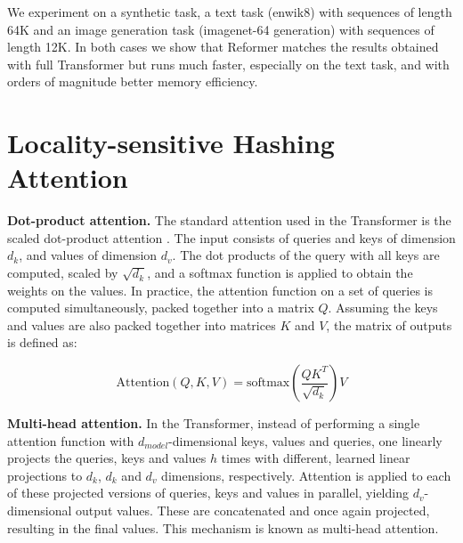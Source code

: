 \documentclass{article} %
\renewcommand{\paragraph}[1]{\textbf{#1}}
\begin{document}
We experiment on a synthetic task, a text task (enwik8) with sequences of length 64K and an image generation task (imagenet-64 generation)
with sequences of length 12K. In both cases we show that Reformer matches the results obtained with full Transformer
but runs much faster, especially on the text task, and with orders of magnitude better memory efficiency.

\section{Locality-sensitive Hashing Attention}

\paragraph{Dot-product attention.}
The standard attention used in the Transformer is the scaled dot-product attention \citep{transformer}. 
The input consists of queries and keys of dimension $d_k$, and values of dimension $d_v$.  
The dot products of the query with all keys are computed, scaled by $\sqrt{d_k}$, and a softmax function is 
applied to obtain the weights on the values. In practice, the attention function on a set of queries is computed 
simultaneously, packed together into a matrix $Q$.  Assuming the keys and values are also packed together into 
matrices $K$ and $V$, the matrix of outputs is defined as:

\begin{equation}\label{eq:attn}
   \mathrm{Attention}(Q, K, V) = \mathrm{softmax}(\frac{QK^T}{\sqrt{d_k}})V
\end{equation}

\paragraph{Multi-head attention.}
In the Transformer, instead of performing a single attention function with $d_{model}$-dimensional keys, 
values and queries, one linearly projects the queries, keys and values $h$ times with different, 
learned linear projections to $d_k$, $d_k$ and $d_v$ dimensions, respectively.  Attention is applied to 
each of these projected versions of queries, keys and values in parallel, yielding $d_v$-dimensional 
output values. These are concatenated and once again projected, resulting in the final values. This 
mechanism is known as multi-head attention.
\end{document}
